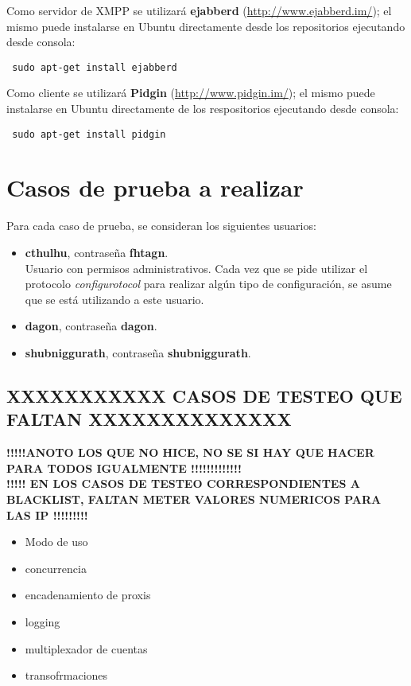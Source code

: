 \documentclass[a4paper,10pt]{article}
\begin{document}
Como servidor de XMPP se utilizará \textbf{ejabberd} (\url{http://www.ejabberd.im/}); el mismo puede instalarse en Ubuntu directamente desde los repositorios 
ejecutando desde consola:
\begin{verbatim}
 sudo apt-get install ejabberd
\end{verbatim}
Como cliente se utilizará \textbf{Pidgin} (\url{http://www.pidgin.im/}); el mismo puede instalarse en Ubuntu directamente de los respositorios ejecutando 
desde consola:
\begin{verbatim}
 sudo apt-get install pidgin
\end{verbatim}

\section{Casos de prueba a realizar}
Para cada caso de prueba, se consideran los siguientes usuarios:
\begin{itemize}
  \item \textbf{cthulhu}, contraseña \textbf{fhtagn}.\\
	Usuario con permisos administrativos. Cada vez que se pide utilizar el protocolo \textit{configurotocol}
	para realizar algún tipo de configuración, se asume que se está utilizando a este usuario.
  \item \textbf{dagon}, contraseña \textbf{dagon}.
  \item \textbf{shubniggurath}, contraseña \textbf{shubniggurath}.
\end{itemize}

\subsection{XXXXXXXXXXX CASOS DE TESTEO QUE FALTAN XXXXXXXXXXXXXX}
\textbf{!!!!!ANOTO LOS QUE NO HICE, NO SE SI HAY QUE HACER PARA TODOS IGUALMENTE !!!!!!!!!!!!!}\\
\textbf{!!!!! EN LOS CASOS DE TESTEO CORRESPONDIENTES A BLACKLIST, FALTAN METER VALORES NUMERICOS PARA LAS IP !!!!!!!!!}
\begin{itemize}
 \item Modo de uso
 \item concurrencia
 \item encadenamiento de proxis
 \item logging
 \item multiplexador de cuentas
 \item transofrmaciones
\end{itemize}
\end{document}
